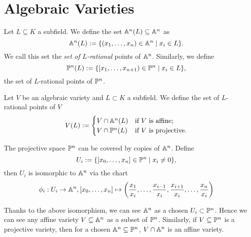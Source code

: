 \section{Algebraic Varieties}

\begin{definition}
	Let $L \subseteq K$ a subfield.
	We define the set $\mathbb{A}^n(L) \subseteq \mathbb{A}^n$ as
	\begin{equation*}
		\mathbb{A}^n(L) := \{(x_1, \dots, x_n) \in \mathbb{A}^n \mid x_i \in L\}.
	\end{equation*}
	We call this set the \emph{set of $L$-rational} points of $\mathbb{A}^n$.
	Similarly, we define
	\begin{equation*}
		\mathbb{P}^n(L) := \{[x_1, \dots, x_{n+1}) \in \mathbb{P}^n \mid x_i \in L\},
	\end{equation*}
	the set of $L$-rational points of $\mathbb{P}^n$.
\end{definition}

\begin{definition}
	Let $V$ be an algebraic variety and 
	$L \subset K$ a subfield. We define the set
	of $L$-rational points of $V$
	\begin{equation*}
		V(L) := 
		\begin{cases}
			V\cap\mathbb{A}^n(L) &\textrm{if $V$ is affine;}\\
			V\cap\mathbb{P}^n(L) &\textrm{if $V$ is projective.}
		\end{cases}
	\end{equation*}
\end{definition}

The projective space $\mathbb{P}^n$ can be covered by copies of $\mathbb{A}^n$. Define
\begin{equation*}
	U_i := \{[x_0, \dots, x_n] \in \mathbb{P}^n \mid x_i \neq 0\},
\end{equation*}
then $U_i$ is isomorphic to $\mathbb{A}^n$ via the chart
\begin{equation*}
	\phi_i: U_i \to \mathbb{A}^n, [x_0, \dots, x_n] \mapsto \left(\frac{x_1}{x_i}, \dots,
		\frac{x_{i-1}}{x_i}, \frac{x_{i+1}}{x_i}, \dots, 
		\frac{x_n}{x_i}\right)
\end{equation*}

\begin{notation}
	Thanks to the above isomorphism, we can see $\mathbb{A}^n$ as a chosen
	$U_i \subset \mathbb{P}^n$. Hence we can see any affine variety
	$V \subseteq \mathbb{A}^n$ as a subset of $\mathbb{P}^n$. Similarly, if $V \subseteq
	\mathbb{P}^n$ is a projective variety, then for a chosen $\mathbb{A}^n \subseteq \mathbb{P}^n$,
	$V \cap \mathbb{A}^n$ is an affine variety.
\end{notation}


